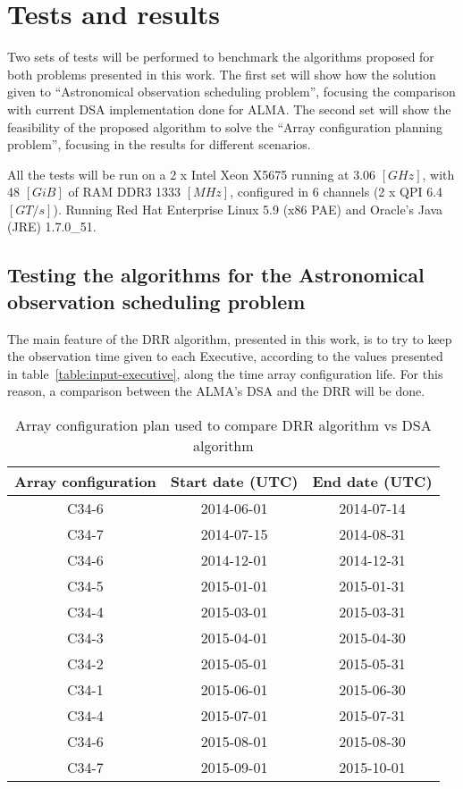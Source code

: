 \chapter{Tests and results}

Two sets of tests will be performed to benchmark the algorithms proposed for both problems presented in this work.
The first set will show how the solution given to ``Astronomical observation scheduling problem'', focusing the comparison with current DSA implementation done for ALMA.
The second set will show the feasibility of the proposed algorithm to solve the ``Array configuration planning problem'', focusing in the results for different scenarios.

All the tests will be run on a 2 x Intel Xeon X5675 running at 3.06 $[GHz]$, with 48 $[GiB]$ of RAM DDR3 1333 $[MHz]$, configured in 6 channels (2 x QPI 6.4 $[GT/s]$). Running Red Hat Enterprise Linux 5.9 (x86 PAE) and Oracle's Java (JRE) 1.7.0\_51.

\section{Testing the algorithms for the Astronomical observation scheduling problem}

The main feature of the DRR algorithm, presented in this work, is to try to keep the observation time given to each Executive, according to the values presented in table~\ref{table:input-executive}, along the time array configuration life. For this reason, a comparison between the ALMA's DSA and the DRR will be done. 

\begin{table}[b]
\begin{center}
\begin{tabular}{|c|c|c|}
\hline
Array configuration & Start date (UTC) & End date (UTC) \\ \hline
C34-6 & 2014-06-01 & 2014-07-14 \\ \hline
C34-7 & 2014-07-15 & 2014-08-31 \\ \hline
C34-6 & 2014-12-01 & 2014-12-31 \\ \hline
C34-5 & 2015-01-01 & 2015-01-31 \\ \hline
C34-4 & 2015-03-01 & 2015-03-31 \\ \hline
C34-3 & 2015-04-01 & 2015-04-30 \\ \hline
C34-2 & 2015-05-01 & 2015-05-31 \\ \hline
C34-1 & 2015-06-01 & 2015-06-30 \\ \hline
C34-4 & 2015-07-01 & 2015-07-31 \\ \hline
C34-6 & 2015-08-01 & 2015-08-30 \\ \hline
C34-7 & 2015-09-01 & 2015-10-01 \\ \hline
\end{tabular}
\end{center}
\caption{Array configuration plan used to compare DRR algorithm vs DSA algorithm}
\label{table:drr-test-array-config}
\end{table}

